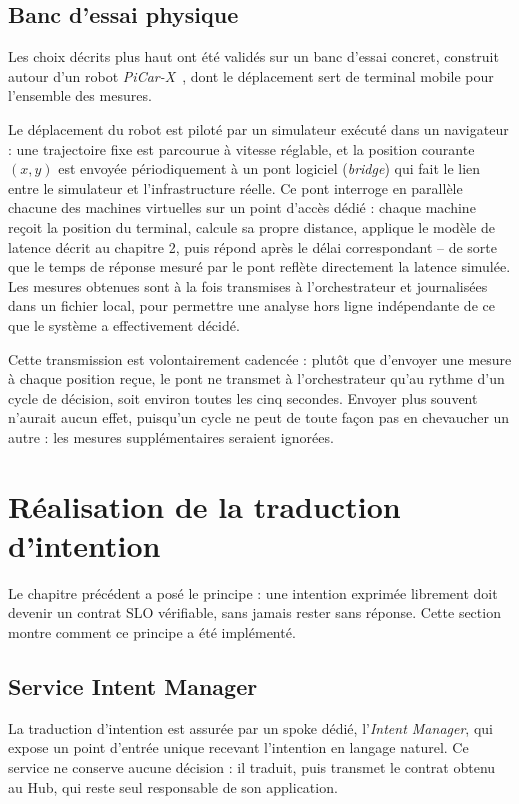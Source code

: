\subsection{Banc d'essai physique}

Les choix décrits plus haut ont été validés sur un banc d'essai concret, construit autour d'un robot \emph{PiCar-X}~\cite{sunfounder_picarx}, dont le déplacement sert de terminal mobile pour l'ensemble des mesures.

Le déplacement du robot est piloté par un simulateur exécuté dans un navigateur : une trajectoire fixe est parcourue à vitesse réglable, et la position courante $(x, y)$ est envoyée périodiquement à un pont logiciel (\emph{bridge}) qui fait le lien entre le simulateur et l'infrastructure réelle. Ce pont interroge en parallèle chacune des machines virtuelles sur un point d'accès dédié : chaque machine reçoit la position du terminal, calcule sa propre distance, applique le modèle de latence décrit au chapitre 2, puis répond après le délai correspondant -- de sorte que le temps de réponse mesuré par le pont reflète directement la latence simulée. Les mesures obtenues sont à la fois transmises à l'orchestrateur et journalisées dans un fichier local, pour permettre une analyse hors ligne indépendante de ce que le système a effectivement décidé.

Cette transmission est volontairement cadencée : plutôt que d'envoyer une mesure à chaque position reçue, le pont ne transmet à l'orchestrateur qu'au rythme d'un cycle de décision, soit environ toutes les cinq secondes. Envoyer plus souvent n'aurait aucun effet, puisqu'un cycle ne peut de toute façon pas en chevaucher un autre : les mesures supplémentaires seraient ignorées.

\section{Réalisation de la traduction d'intention}
\label{sec:realisation-traduction}

Le chapitre précédent a posé le principe : une intention exprimée librement doit devenir un contrat SLO vérifiable, sans jamais rester sans réponse. Cette section montre comment ce principe a été implémenté.

\subsection{Service Intent Manager}

La traduction d'intention est assurée par un spoke dédié, l'\emph{Intent Manager}, qui expose un point d'entrée unique recevant l'intention en langage naturel. Ce service ne conserve aucune décision : il traduit, puis transmet le contrat obtenu au Hub, qui reste seul responsable de son application.

